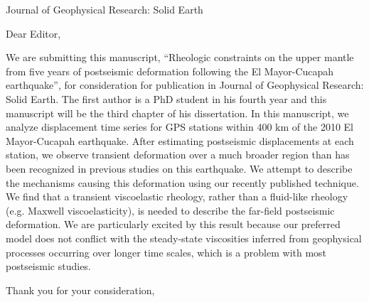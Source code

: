 \documentclass[12pt,letterpaper]{letter}
\begin{document}
\address{Department of Earth and Environmental Sciences\\
  University of Michigan\\
  1100 North University Ave.\\
  Ann Arbor, MI 48109\\}

\signature{Trever T. Hines}

\begin{letter}{Journal of Geophysical Research: Solid Earth}
\opening{Dear Editor,}

We are submitting this manuscript, ``Rheologic constraints on the upper mantle from five years of postseismic deformation following the El Mayor-Cucapah earthquake'', for consideration for publication in
Journal of Geophysical Research: Solid Earth.  The first author is a PhD student in his fourth year and this manuscript will be the third chapter of his dissertation.  In this manuscript, we analyze displacement time series for GPS stations within 400 km of the 2010 El Mayor-Cucapah earthquake. After estimating postseismic displacements at each station, we observe transient deformation over a much broader region than has been recognized in previous studies on this earthquake.  We attempt to describe the mechanisms causing this deformation using our recently published technique.  We find that a transient viscoelastic rheology, rather than a fluid-like rheology (e.g. Maxwell viscoelasticity), is needed to describe the far-field postseismic deformation.  We are particularly excited by this result because our preferred model does not conflict with the steady-state viscosities inferred from geophysical processes occurring over longer time scales, which is a problem with most postseismic studies.             


\closing{Thank you for your consideration,}

\end{letter}
\end{document}
